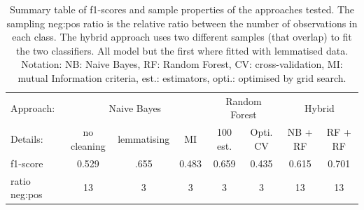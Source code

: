 \documentclass[a4paper]{tufte-handout}
\begin{document}
\begin{fullwidth}
\newpage
\begin{table}\label{scores}
\begin{tabular}{l|ccc|cc|cc}
Approach:                                                        & \multicolumn{3}{c|}{Naive Bayes}   & \multicolumn{2}{c|}{Random Forest} & \multicolumn{2}{c}{Hybrid} \\
Details:                                                         & no cleaning & lemmatising & MI    & 100 est.         & Opti. CV        & NB + RF      & RF + RF      \\ \hline
f1-score                                 & 0.529        & .655        & 0.483 & 0.659            & 0.435           & 0.615        & 0.701       \\
ratio neg:pos & 13           & 3           & 3     & 3                & 3               & 13       & 13     \\
   
\end{tabular}
\vspace{1cm}
\caption{Summary table of f1-scores and sample properties of the approaches tested. The sampling neg:pos ratio is the relative ratio between the number of observations in each class. The hybrid approach uses two different samples (that overlap) to fit the two classifiers. All model but the first where fitted with lemmatised data. Notation: NB: Naive Bayes, RF: Random Forest, CV: cross-validation, MI: mutual Information criteria, est.: estimators, opti.: optimised by grid search. }
\end{table}






\end{fullwidth}
\end{document}
